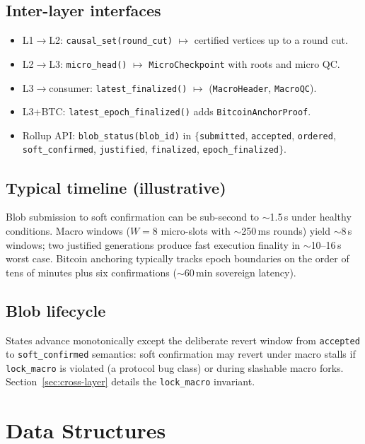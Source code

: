 \documentclass[11pt,a4paper,twoside]{report}
\theoremstyle{definition}
\begin{document}
\section{Inter-layer interfaces}
\label{sec:interfaces}
\begin{itemize}[leftmargin=*]
  \item L1$\to$L2: \texttt{causal\_set(round\_cut)} $\mapsto$ certified vertices up to a round cut.
  \item L2$\to$L3: \texttt{micro\_head()} $\mapsto$ \texttt{MicroCheckpoint} with roots and micro QC.
  \item L3$\to$consumer: \texttt{latest\_finalized()} $\mapsto$ (\texttt{MacroHeader}, \texttt{MacroQC}).
  \item L3+BTC: \texttt{latest\_epoch\_finalized()} adds \texttt{BitcoinAnchorProof}.
  \item Rollup API: \texttt{blob\_status(blob\_id)} in $\{$\texttt{submitted}, \texttt{accepted}, \texttt{ordered}, \texttt{soft\_confirmed}, \texttt{justified}, \texttt{finalized}, \texttt{epoch\_finalized}$\}$.
\end{itemize}

\section{Typical timeline (illustrative)}
Blob submission to soft confirmation can be sub-second to $\sim$1.5\,s under healthy conditions. Macro windows ($W=8$ micro-slots with $\sim$250\,ms rounds) yield $\sim$8\,s windows; two justified generations produce fast execution finality in $\sim$10--16\,s worst case. Bitcoin anchoring typically tracks epoch boundaries on the order of tens of minutes plus six confirmations ($\sim$60\,min sovereign latency).

\section{Blob lifecycle}
States advance monotonically except the deliberate revert window from \texttt{accepted} to \texttt{soft\_confirmed} semantics: soft confirmation may revert under macro stalls if \texttt{lock\_macro} is violated (a protocol bug class) or during slashable macro forks. Section~\ref{sec:cross-layer} details the \texttt{lock\_macro} invariant.

\chapter{Data Structures}
\label{ch:data}
\end{document}
